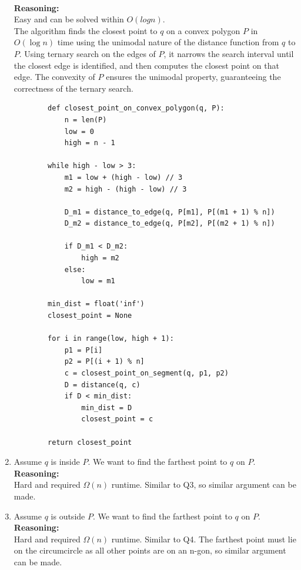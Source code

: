 \documentclass{article}
\begin{document}
\begin{enumerate}
    \\
    \textbf{Reasoning: }
    \\
    Easy and can be solved within $O(logn)$. 
    \\
    The algorithm finds the closest point to \( q \) on a convex polygon \( P \) in \( O(\log n) \) time using the unimodal nature of the distance function from \( q \) to \( P \). 
    Using ternary search on the edges of \( P \), it narrows the search interval until the closest edge is identified, and then computes the closest point on that edge. 
    The convexity of \( P \) ensures the unimodal property, guaranteeing the correctness of the ternary search.
    
    \begin{verbatim}
        def closest_point_on_convex_polygon(q, P):
            n = len(P)
            low = 0
            high = n - 1

        while high - low > 3:
            m1 = low + (high - low) // 3
            m2 = high - (high - low) // 3

            D_m1 = distance_to_edge(q, P[m1], P[(m1 + 1) % n])
            D_m2 = distance_to_edge(q, P[m2], P[(m2 + 1) % n])

            if D_m1 < D_m2:
                high = m2
            else:
                low = m1

        min_dist = float('inf')
        closest_point = None

        for i in range(low, high + 1):
            p1 = P[i]
            p2 = P[(i + 1) % n]
            c = closest_point_on_segment(q, p1, p2)
            D = distance(q, c)
            if D < min_dist:
                min_dist = D
                closest_point = c

        return closest_point
    \end{verbatim}
    \item Assume $q$ is inside $P$. We want to find the farthest point to $q$ on $P$.
    \\
    \textbf{Reasoning: }
    \\
    Hard and required $\Omega(n)$ runtime. Similar to Q3, so similar argument can be made.
    \item Assume $q$ is outside $P$. We want to find the farthest point to $q$ on $P$.
    \\
    \textbf{Reasoning: }
    \\
    Hard and required $\Omega(n)$ runtime. Similar to Q4. The farthest point must lie on the circumcircle as all other points are on an n-gon, so similar argument can be made.
\end{enumerate}
\end{document}

